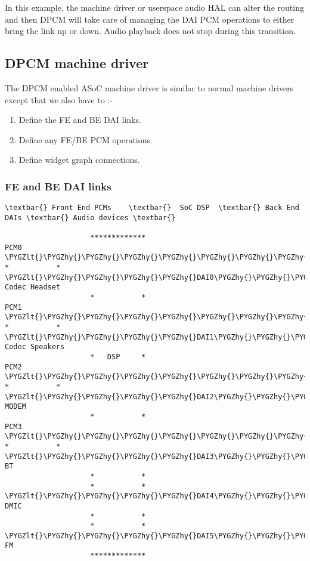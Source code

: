 \documentclass[a4paper,8pt,english]{sphinxmanual}
\def\PYGZlt{\char`\<}
\def\PYGZgt{\char`\>}
\def\PYGZhy{\char`\-}
\begin{document}
In this example, the machine driver or userspace audio HAL can alter the routing
and then DPCM will take care of managing the DAI PCM operations to either bring
the link up or down. Audio playback does not stop during this transition.


\subsection{DPCM machine driver}
\label{sound/soc/dpcm:dpcm-machine-driver}
The DPCM enabled ASoC machine driver is similar to normal machine drivers
except that we also have to :-
\begin{enumerate}
\item {} 
Define the FE and BE DAI links.

\item {} 
Define any FE/BE PCM operations.

\item {} 
Define widget graph connections.

\end{enumerate}


\subsubsection{FE and BE DAI links}
\label{sound/soc/dpcm:fe-and-be-dai-links}
\begin{Verbatim}[commandchars=\\\{\}]
\textbar{} Front End PCMs    \textbar{}  SoC DSP  \textbar{} Back End DAIs \textbar{} Audio devices \textbar{}

                    *************
PCM0 \PYGZlt{}\PYGZhy{}\PYGZhy{}\PYGZhy{}\PYGZhy{}\PYGZhy{}\PYGZhy{}\PYGZhy{}\PYGZhy{}\PYGZhy{}\PYGZhy{}\PYGZhy{}\PYGZhy{}\PYGZgt{} *           * \PYGZlt{}\PYGZhy{}\PYGZhy{}\PYGZhy{}\PYGZhy{}DAI0\PYGZhy{}\PYGZhy{}\PYGZhy{}\PYGZhy{}\PYGZhy{}\PYGZgt{} Codec Headset
                    *           *
PCM1 \PYGZlt{}\PYGZhy{}\PYGZhy{}\PYGZhy{}\PYGZhy{}\PYGZhy{}\PYGZhy{}\PYGZhy{}\PYGZhy{}\PYGZhy{}\PYGZhy{}\PYGZhy{}\PYGZhy{}\PYGZgt{} *           * \PYGZlt{}\PYGZhy{}\PYGZhy{}\PYGZhy{}\PYGZhy{}DAI1\PYGZhy{}\PYGZhy{}\PYGZhy{}\PYGZhy{}\PYGZhy{}\PYGZgt{} Codec Speakers
                    *   DSP     *
PCM2 \PYGZlt{}\PYGZhy{}\PYGZhy{}\PYGZhy{}\PYGZhy{}\PYGZhy{}\PYGZhy{}\PYGZhy{}\PYGZhy{}\PYGZhy{}\PYGZhy{}\PYGZhy{}\PYGZhy{}\PYGZgt{} *           * \PYGZlt{}\PYGZhy{}\PYGZhy{}\PYGZhy{}\PYGZhy{}DAI2\PYGZhy{}\PYGZhy{}\PYGZhy{}\PYGZhy{}\PYGZhy{}\PYGZgt{} MODEM
                    *           *
PCM3 \PYGZlt{}\PYGZhy{}\PYGZhy{}\PYGZhy{}\PYGZhy{}\PYGZhy{}\PYGZhy{}\PYGZhy{}\PYGZhy{}\PYGZhy{}\PYGZhy{}\PYGZhy{}\PYGZhy{}\PYGZgt{} *           * \PYGZlt{}\PYGZhy{}\PYGZhy{}\PYGZhy{}\PYGZhy{}DAI3\PYGZhy{}\PYGZhy{}\PYGZhy{}\PYGZhy{}\PYGZhy{}\PYGZgt{} BT
                    *           *
                    *           * \PYGZlt{}\PYGZhy{}\PYGZhy{}\PYGZhy{}\PYGZhy{}DAI4\PYGZhy{}\PYGZhy{}\PYGZhy{}\PYGZhy{}\PYGZhy{}\PYGZgt{} DMIC
                    *           *
                    *           * \PYGZlt{}\PYGZhy{}\PYGZhy{}\PYGZhy{}\PYGZhy{}DAI5\PYGZhy{}\PYGZhy{}\PYGZhy{}\PYGZhy{}\PYGZhy{}\PYGZgt{} FM
                    *************
\end{Verbatim}
\end{document}

